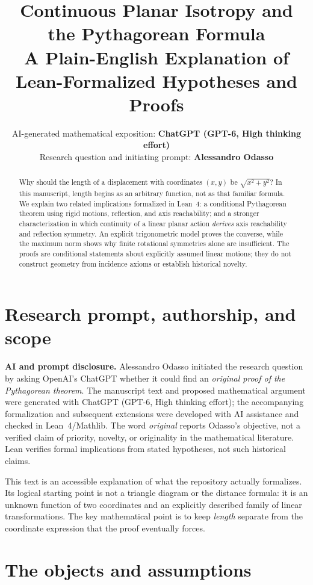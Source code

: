 \documentclass[11pt,a4paper]{article}
\title{\textbf{Continuous Planar Isotropy and the Pythagorean Formula}\\[0.35em]
\large A Plain-English Explanation of Lean-Formalized Hypotheses and Proofs}
\author{AI-generated mathematical exposition: \textbf{ChatGPT (GPT-6, High thinking effort)}\\
Research question and initiating prompt: \textbf{Alessandro Odasso}}
\date{}
\begin{document}
\maketitle

\begin{abstract}
Why should the length of a displacement with coordinates $(x,y)$ be
$\sqrt{x^2+y^2}$? In this manuscript, length begins as an arbitrary
function, not as that familiar formula. We explain two related
implications formalized in Lean~4: a conditional Pythagorean theorem
using rigid motions, reflection, and axis reachability; and a stronger
characterization in which continuity of a linear planar action
\emph{derives} axis reachability and reflection symmetry. An explicit
trigonometric model proves the converse, while the maximum norm shows
why finite rotational symmetries alone are insufficient. The proofs
are conditional statements about explicitly assumed linear motions;
they do not construct geometry from incidence axioms or establish
historical novelty.
\end{abstract}

\section{Research prompt, authorship, and scope}

\noindent\textbf{AI and prompt disclosure.}
Alessandro Odasso initiated the research question by asking OpenAI's
ChatGPT whether it could find an \emph{original proof of the
Pythagorean theorem}. The manuscript text and proposed mathematical
argument were generated with ChatGPT (GPT-6, High thinking effort);
the accompanying formalization and subsequent extensions were
developed with AI assistance and checked in Lean~4/Mathlib. The
word \emph{original} reports Odasso's objective, not a verified
claim of priority, novelty, or originality in the mathematical
literature. Lean verifies formal implications from stated hypotheses,
not such historical claims.

This text is an accessible explanation of what the repository
actually formalizes. Its logical starting point is not a triangle
diagram or the distance formula: it is an unknown function of two
coordinates and an explicitly described family of linear
transformations. The key mathematical point is to keep \emph{length}
separate from the coordinate expression that the proof eventually
forces.

\section{The objects and assumptions}
\end{document}
